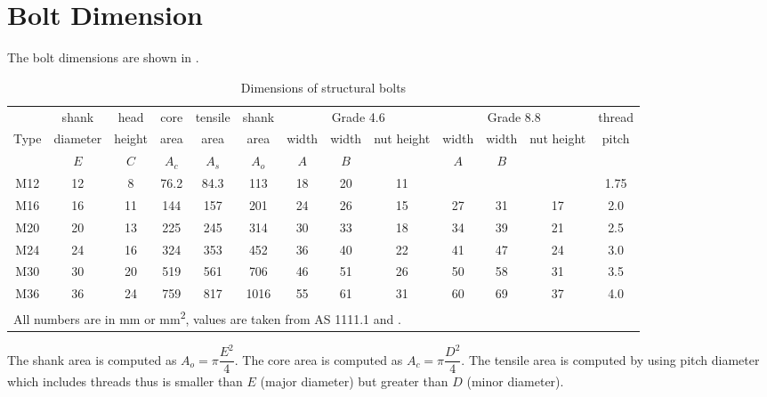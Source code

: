 \section{Bolt Dimension}
The bolt dimensions are shown in .
\begin{table}[H]
\setlength{\tabcolsep}{0.2em}
\centering\footnotesize\caption{Dimensions of structural bolts}\label{tab:bolt_dim}
\begin{tabular}{c|cc|ccc|ccc|ccc|c}
    \toprule
         &  shank   &  head  & core  & tensile & shank & \multicolumn{3}{c|}{Grade 4.6} & \multicolumn{3}{c|}{Grade 8.8} & thread \\
    Type & diameter & height & area  &  area   & area  & width & width &   nut height   & width & width &   nut height   & pitch  \\
         &   $E$    &  $C$   & $A_c$ &  $A_s$  & $A_o$ &  $A$  &  $B$  &                &  $A$  &  $B$  &                &        \\ \midrule
    M12  &    12    &   8    & 76.2  &  84.3   &  113  &  18   &  20   &       11       &       &       &                &  1.75  \\
    M16  &    16    &   11   &  144  &   157   &  201  &  24   &  26   &       15       &  27   &  31   &       17       &  2.0   \\
    M20  &    20    &   13   &  225  &   245   &  314  &  30   &  33   &       18       &  34   &  39   &       21       &  2.5   \\
    M24  &    24    &   16   &  324  &   353   &  452  &  36   &  40   &       22       &  41   &  47   &       24       &  3.0   \\
    M30  &    30    &   20   &  519  &   561   &  706  &  46   &  51   &       26       &  50   &  58   &       31       &  3.5   \\
    M36  &    36    &   24   &  759  &   817   & 1016  &  55   &  61   &       31       &  60   &  69   &       37       &  4.0   \\ \bottomrule
    \multicolumn{13}{l}{All numbers are in \si{\mm} or \si{\mm^2}, values are taken from AS 1111.1 and \ASNZSFASTERNER{~}.}
\end{tabular}
\end{table}
The shank area is computed as $A_o=\pi\dfrac{E^2}{4}$. The core area is computed as $A_c=\pi\dfrac{D^2}{4}$. The tensile area is computed by using pitch diameter which includes threads thus is smaller than $E$ (major diameter) but greater than $D$ (minor diameter).
